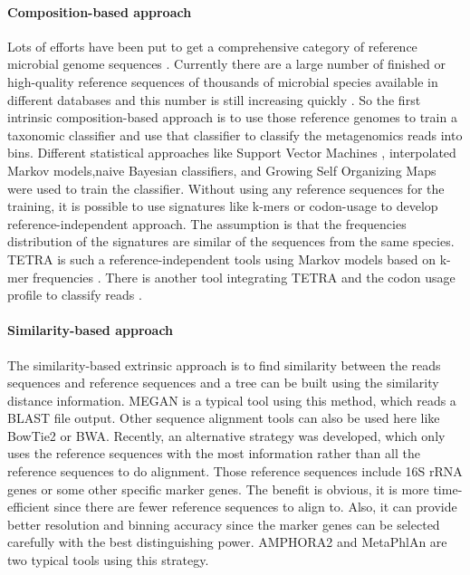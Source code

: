 \paragraph{Composition-based approach} Lots of efforts have been put to get a
comprehensive category of reference microbial genome sequences \cite{HMScience,
Wu:2009aa}. Currently there are a large number of finished or high-quality
reference sequences of thousands of microbial species available in different
databases and this number is still increasing quickly \cite{Markowitz:2012aa,
Glass:2010aa, Wang:2007aa}. So the first intrinsic composition-based approach
is to use those reference genomes to train a taxonomic classifier and use that
classifier to classify the metagenomics reads into bins. Different statistical
approaches like Support Vector Machines \cite{Patil:2012aa}, interpolated
Markov models\cite{Brady:2011aa},naive Bayesian classifiers, and Growing Self
Organizing Maps \cite{Rosen:2011aa} were used to train the classifier. Without
using any reference sequences for the training, it is possible to use
signatures like k-mers or codon-usage to develop reference-independent
approach. The assumption is that the frequencies distribution of the signatures
are similar of the sequences from the same species. TETRA is such a
reference-independent tools using Markov models based on k-mer frequencies
\cite{Teeling:2004aa}. There is another tool integrating TETRA and the codon usage
profile to classify reads \cite{Tzahor:2009aa}.


\paragraph{Similarity-based approach} The similarity-based extrinsic approach
is to find similarity between the reads sequences and reference sequences and a
tree can be built using the similarity distance information. MEGAN
\cite{Huson:2007aa} is a typical tool using this method, which reads a BLAST
file output. Other sequence alignment tools can also be used here like BowTie2
or BWA. Recently, an alternative strategy was developed, which only uses the
reference sequences with the most information rather than all the reference
sequences to do alignment. Those reference sequences include 16S rRNA genes or
some other specific marker genes. The benefit is obvious, it is more
time-efficient since there are fewer reference sequences to align to. Also, it
can provide better resolution and binning accuracy since the marker genes can
be selected carefully with the best distinguishing power. AMPHORA2
\cite{Wu:2012aa} and MetaPhlAn \cite{Segata:2012aa} are two typical tools using
this strategy.



